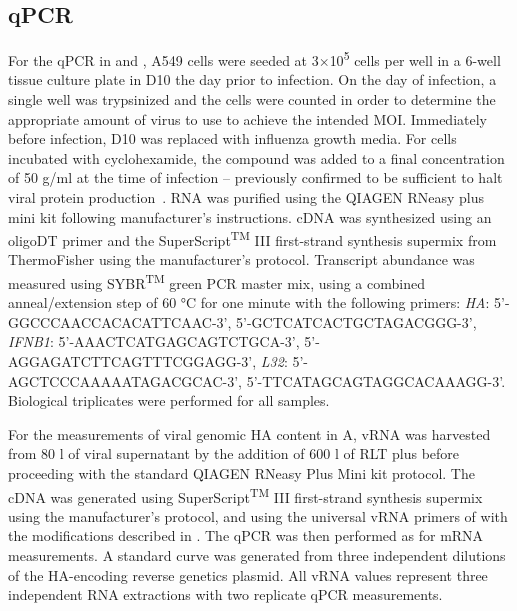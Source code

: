 \documentclass[9pt,lineno]{elife}
\begin{document}
\subsection{qPCR}
For the qPCR in  and , A549 cells were seeded at 3$\times$10\textsuperscript{5} cells per well in a 6-well tissue culture plate in D10 the day prior to infection. 
On the day of infection, a single well was trypsinized and the cells were counted in order to determine the appropriate amount of virus to use to achieve the intended MOI.
Immediately before infection, D10 was replaced with influenza growth media.
For cells incubated with cyclohexamide, the compound was added to a final concentration of 50  \si{\micro}g/ml at the time of infection -- previously confirmed to be sufficient to halt viral protein production~\citep{Killip:2014kz}.
RNA was purified using the QIAGEN RNeasy plus mini kit following manufacturer's instructions. 
cDNA was synthesized using an oligoDT primer and the SuperScript\textsuperscript{TM} III first-strand synthesis supermix from ThermoFisher using the manufacturer's protocol. 
Transcript abundance was measured using SYBR\textsuperscript{TM} green PCR master mix, using a combined anneal/extension step of 60 \si{\degreeCelsius } for one minute with the following primers: \emph{HA}: 5'-GGCCCAACCACACATTCAAC-3', 5'-GCTCATCACTGCTAGACGGG-3', \emph{IFNB1}: 5'-AAACTCATGAGCAGTCTGCA-3', 5'-AGGAGATCTTCAGTTTCGGAGG-3', \emph{L32}: 5'-AGCTCCCAAAAATAGACGCAC-3', 5'-TTCATAGCAGTAGGCACAAAGG-3'.   
Biological triplicates were performed for all samples.

For the measurements of viral genomic HA content in A, vRNA was harvested from 80 \si{\micro}l of viral supernatant by the addition of 600 \si{\micro}l of RLT plus before proceeding with the standard QIAGEN RNeasy Plus Mini kit protocol.
The cDNA was generated using SuperScript\textsuperscript{TM} III first-strand synthesis supermix using the manufacturer's protocol, and using the universal vRNA primers of \citet{Hoffmann:2001vj} with the modifications described in  \citet{Xue:2017dl}.
The qPCR was then performed as for mRNA measurements.
A standard curve was generated from three independent dilutions of the HA-encoding reverse genetics plasmid. 
All vRNA values represent three independent RNA extractions with two replicate qPCR measurements. 
\end{document}
